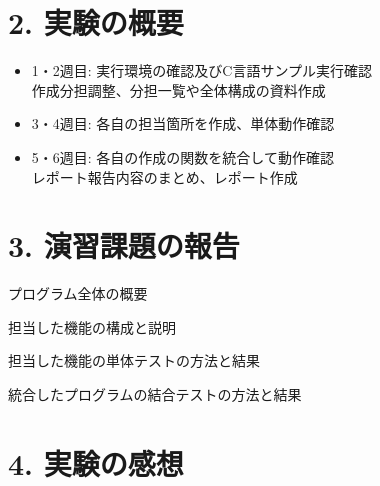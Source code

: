 \documentclass[lualatex, ja=standard, a4j, 12pt]{bxjsarticle}
\begin{document}
\section*{2. 実験の概要}
\begin{itemize}[left=2em]
    \item 1・2週目: 実行環境の確認及びC言語サンプル実行確認 \\
    作成分担調整、分担一覧や全体構成の資料作成
    \item 3・4週目: 各自の担当箇所を作成、単体動作確認
    \item 5・6週目: 各自の作成の関数を統合して動作確認 \\
    レポート報告内容のまとめ、レポート作成
\end{itemize}

\section*{3. 演習課題の報告}
プログラム全体の概要


担当した機能の構成と説明

担当した機能の単体テストの方法と結果

統合したプログラムの結合テストの方法と結果

\section*{4. 実験の感想}
\end{document}

